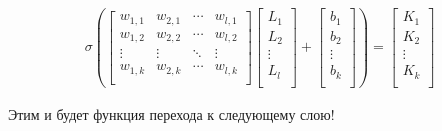 \documentclass{article}
\begin{document}
        \begin{align}
            \sigma
            \left(
            \begin{bmatrix}
                w_{1,1} & w_{2,1} & \cdots  & w_{l,1} \\
                w_{1,2} & w_{2,2} & \cdots  & w_{l,2} \\
                \vdots  & \vdots  & \ddots  & \vdots  \\
                w_{1,k} & w_{2,k} & \cdots  & w_{l,k} \\
            \end{bmatrix}
            \begin{bmatrix}
                L_1    \\
                L_2    \\
                \vdots \\
                L_l    \\
            \end{bmatrix} + 
            \begin{bmatrix}
                b_1    \\
                b_2    \\
                \vdots \\
                b_k    \\
            \end{bmatrix}
            \right) = 
            \begin{bmatrix}
                K_1    \\
                K_2    \\
                \vdots \\
                K_k    \\
            \end{bmatrix}
        \end{align}

        Этим и будет функция перехода к следующему слою!

\end{document}
